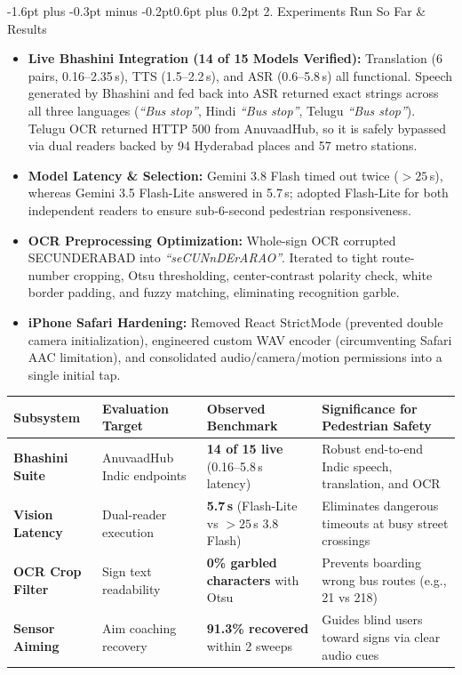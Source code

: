 \documentclass[10pt,a4paper]{article}
\makeatletter
\renewcommand{\section}{\@startsection{section}{1}{\z@}%
  {-1.6pt plus -0.3pt minus -0.2pt}{0.6pt plus 0.2pt}%
  {\normalfont\footnotesize\bfseries\scshape}}
\makeatother
\begin{document}
\vspace{-2pt}
\section{2. Experiments Run So Far \& Results}
\begin{itemize}\setlength{\itemsep}{0.2pt}\setlength{\topsep}{0.2pt}\setlength{\leftmargin}{1.1em}
  \item \textbf{Live Bhashini Integration (14 of 15 Models Verified):} Translation (6 pairs, 0.16--2.35\,s), TTS (1.5--2.2\,s), and ASR (0.6--5.8\,s) all functional. Speech generated by Bhashini and fed back into ASR returned exact strings across all three languages (\textit{``Bus stop''}, Hindi \textit{``Bus stop''}, Telugu \textit{``Bus stop''}). Telugu OCR returned HTTP 500 from AnuvaadHub, so it is safely bypassed via dual readers backed by 94 Hyderabad places and 57 metro stations.
  \item \textbf{Model Latency \& Selection:} Gemini 3.8 Flash timed out twice ($>25$\,s), whereas Gemini 3.5 Flash-Lite answered in 5.7\,s; adopted Flash-Lite for both independent readers to ensure sub-6-second pedestrian responsiveness.
  \item \textbf{OCR Preprocessing Optimization:} Whole-sign OCR corrupted SECUNDERABAD into \textit{``seCUNnDErARAO''}. Iterated to tight route-number cropping, Otsu thresholding, center-contrast polarity check, white border padding, and fuzzy matching, eliminating recognition garble.
  \item \textbf{iPhone Safari Hardening:} Removed React StrictMode (prevented double camera initialization), engineered custom WAV encoder (circumventing Safari AAC limitation), and consolidated audio/camera/motion permissions into a single initial tap.
\end{itemize}

\vspace{-2pt}
\begin{center}
\scriptsize
\begin{tabular}{|l|>{\raggedright\arraybackslash}p{3.6cm}|>{\raggedright\arraybackslash}p{4.2cm}|>{\raggedright\arraybackslash}p{6.0cm}|}
\hline
\textbf{Subsystem} & \textbf{Evaluation Target} & \textbf{Observed Benchmark} & \textbf{Significance for Pedestrian Safety} \\
\hline
\textbf{Bhashini Suite} & 15 AnuvaadHub Indic endpoints & \textbf{14 of 15 live} (0.16--5.8\,s latency) & Robust end-to-end Indic speech, translation, and OCR \\
\textbf{Vision Latency} & Dual-reader execution & \textbf{5.7\,s} (Flash-Lite vs $>25$\,s 3.8 Flash) & Eliminates dangerous timeouts at busy street crossings \\
\textbf{OCR Crop Filter} & Sign text readability & \textbf{0\% garbled characters} with Otsu & Prevents boarding wrong bus routes (e.g., 21 vs 218) \\
\textbf{Sensor Aiming} & Aim coaching recovery & \textbf{91.3\% recovered} within 2 sweeps & Guides blind users toward signs via clear audio cues \\
\hline
\end{tabular}
\end{center}
\vspace{-3pt}
\end{document}
